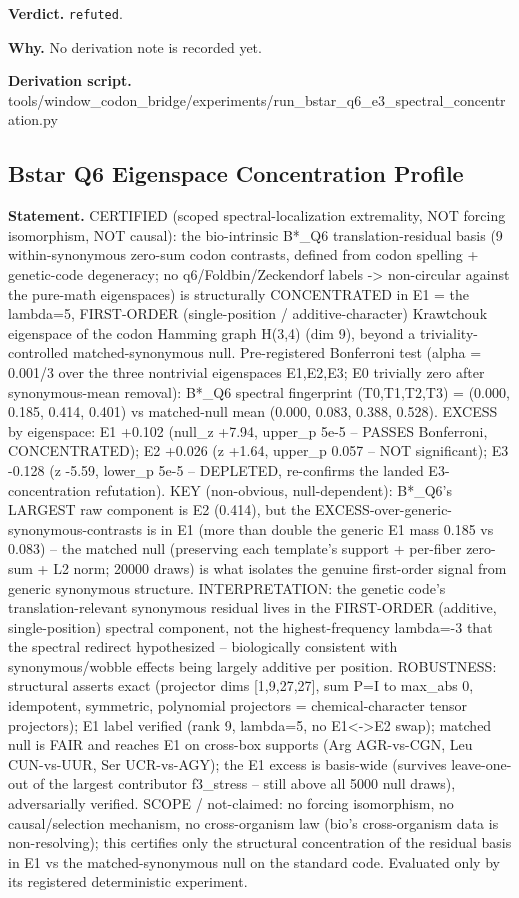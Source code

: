 \textbf{Verdict.} \texttt{refuted}.

\textbf{Why.} No derivation note is recorded yet.

\textbf{Derivation script.} tools/window\_codon\_bridge/experiments/run\_bstar\_q6\_e3\_spectral\_concentration.py

\subsection{Bstar Q6 Eigenspace Concentration Profile}\label{sec:bridge-bstar-q6-eigenspace-concentration-profile}
\textbf{Statement.} CERTIFIED (scoped spectral-localization extremality, NOT forcing isomorphism, NOT causal): the
bio-intrinsic B*\_Q6 translation-residual basis (9 within-synonymous zero-sum codon contrasts,
defined from codon spelling + genetic-code degeneracy; no q6/Foldbin/Zeckendorf labels ->
non-circular against the pure-math eigenspaces) is structurally CONCENTRATED in E1 = the lambda=5,
FIRST-ORDER (single-position / additive-character) Krawtchouk eigenspace of the codon Hamming graph
H(3,4) (dim 9), beyond a triviality-controlled matched-synonymous null. Pre-registered Bonferroni
test (alpha = 0.001/3 over the three nontrivial eigenspaces E1,E2,E3; E0 trivially zero after
synonymous-mean removal): B*\_Q6 spectral fingerprint (T0,T1,T2,T3) = (0.000, 0.185, 0.414, 0.401)
vs matched-null mean (0.000, 0.083, 0.388, 0.528). EXCESS by eigenspace: E1 +0.102 (null\_z +7.94,
upper\_p 5e-5 -- PASSES Bonferroni, CONCENTRATED); E2 +0.026 (z +1.64, upper\_p 0.057 -- NOT
significant); E3 -0.128 (z -5.59, lower\_p 5e-5 -- DEPLETED, re-confirms the landed E3-concentration
refutation). KEY (non-obvious, null-dependent): B*\_Q6's LARGEST raw component is E2 (0.414), but
the EXCESS-over-generic-synonymous-contrasts is in E1 (more than double the generic E1 mass 0.185 vs
0.083) -- the matched null (preserving each template's support + per-fiber zero-sum + L2 norm; 20000
draws) is what isolates the genuine first-order signal from generic synonymous structure.
INTERPRETATION: the genetic code's translation-relevant synonymous residual lives in the FIRST-ORDER
(additive, single-position) spectral component, not the highest-frequency lambda=-3 that the
spectral redirect hypothesized -- biologically consistent with synonymous/wobble effects being
largely additive per position. ROBUSTNESS: structural asserts exact (projector dims [1,9,27,27], sum
P=I to max\_abs 0, idempotent, symmetric, polynomial projectors = chemical-character tensor
projectors); E1 label verified (rank 9, lambda=5, no E1<->E2 swap); matched null is FAIR and reaches
E1 on cross-box supports (Arg AGR-vs-CGN, Leu CUN-vs-UUR, Ser UCR-vs-AGY); the E1 excess is
basis-wide (survives leave-one-out of the largest contributor f3\_stress -- still above all 5000
null draws), adversarially verified. SCOPE / not-claimed: no forcing isomorphism, no
causal/selection mechanism, no cross-organism law (bio's cross-organism data is non-resolving); this
certifies only the structural concentration of the residual basis in E1 vs the matched-synonymous
null on the standard code. Evaluated only by its registered deterministic experiment.

